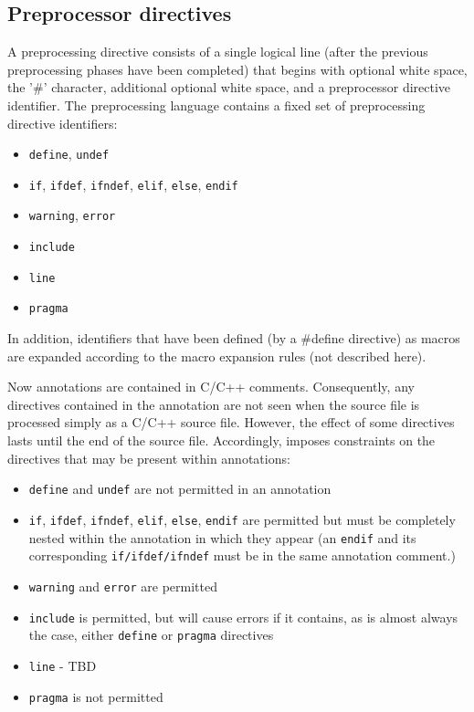 \subsection{Preprocessor directives}
A preprocessing directive consists of a single logical line (after the previous preprocessing phases have been completed) that begins with optional white space, the '\#' character, additional optional white space, and a preprocessor directive identifier.
The preprocessing language contains a fixed set of preprocessing directive identifiers:
\begin{itemize}
	\item \texttt{define}, \texttt{undef}
	\item \texttt{if}, \texttt{ifdef}, \texttt{ifndef}, \texttt{elif}, \texttt{else}, \texttt{endif}
	\item \texttt{warning}, \texttt{error}
	\item \texttt{include}
	\item \texttt{line}
	\item \texttt{pragma}
\end{itemize}
In addition, identifiers that have been defined (by a \#define directive) as macros are expanded according to the macro expansion rules (not described here).

Now \acslb annotations are contained in C/C++ comments. 
Consequently, any directives contained in the annotation are not seen when the source file is processed simply as a C/C++ source file. However, the effect of some directives lasts until the end of the source file. 
Accordingly, \acslpp imposes constraints on the directives that may be present within annotations:
\begin{itemize}
	\item \texttt{define} and \texttt{undef} are not permitted in an annotation
	\item \texttt{if}, \texttt{ifdef}, \texttt{ifndef}, \texttt{elif}, \texttt{else}, \texttt{endif} are permitted but must be completely nested within the annotation in which they appear (an \texttt{endif} and its corresponding \texttt{if/ifdef/ifndef} must be in the same annotation comment.)
	\item \texttt{warning} and \texttt{error} are permitted
	\item \texttt{include} is permitted, but will cause errors if it contains, as is almost always the case, either \texttt{define} or \texttt{pragma} directives
	\item \texttt{line} - TBD
	\item \texttt{pragma} is not permitted
\end{itemize}


